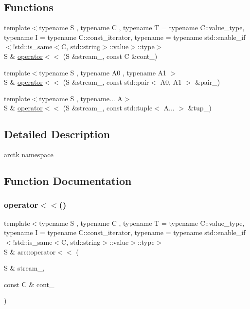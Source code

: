 \subsection*{Functions}
\begin{DoxyCompactItemize}
\item 
{\footnotesize template$<$typename S , typename C , typename T  = typename C\+::value\+\_\+type, typename I  = typename C\+::const\+\_\+iterator, typename  = typename std\+::enable\+\_\+if$<$!std\+::is\+\_\+same$<$\+C, std\+::string$>$\+::value$>$\+::type$>$ }\\S \& \mbox{\hyperlink{namespacearc_af1dbfe8cd5fb9a3a09bfe75114f9057b}{operator$<$$<$}} (S \&stream\+\_\+, const C \&cont\+\_\+)
\item 
{\footnotesize template$<$typename S , typename A0 , typename A1 $>$ }\\S \& \mbox{\hyperlink{namespacearc_ae2d7de3bec14ccfaf44ea00f134895f9}{operator$<$$<$}} (S \&stream\+\_\+, const std\+::pair$<$ A0, A1 $>$ \&pair\+\_\+)
\item 
{\footnotesize template$<$typename S , typename... A$>$ }\\S \& \mbox{\hyperlink{namespacearc_a50e1f816ae8c0b1a32e9adabbe66579a}{operator$<$$<$}} (S \&stream\+\_\+, const std\+::tuple$<$ A... $>$ \&tup\+\_\+)
\end{DoxyCompactItemize}


\subsection{Detailed Description}
arctk namespace 

\subsection{Function Documentation}
\mbox{\label{namespacearc_af1dbfe8cd5fb9a3a09bfe75114f9057b}} 
\subsubsection{\texorpdfstring{operator$<$$<$()}{operator<<()}\hspace{0.1cm}{\footnotesize\ttfamily [1/3]}}
{\footnotesize\ttfamily template$<$typename S , typename C , typename T  = typename C\+::value\+\_\+type, typename I  = typename C\+::const\+\_\+iterator, typename  = typename std\+::enable\+\_\+if$<$!std\+::is\+\_\+same$<$\+C, std\+::string$>$\+::value$>$\+::type$>$ \\
S \& arc\+::operator$<$$<$ (\begin{DoxyParamCaption}\item[{S \&}]{stream\+\_\+,  }\item[{const C \&}]{cont\+\_\+ }\end{DoxyParamCaption})\hspace{0.3cm}{\ttfamily [inline]}}

